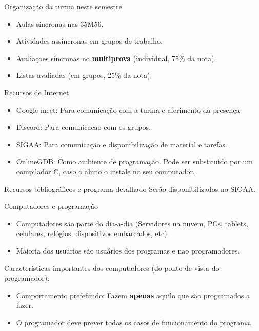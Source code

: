 \documentclass[handout,t]{beamer}
\begin{document}
\begin{frame}{Organização da turma neste semestre}
\vfill
\begin{itemize}
    \item Aulas síncronas nas 35M56. 
    \item Atividades assíncronas em grupos de trabalho.
    \item Avaliaçoes síncronas no \textbf{multiprova} (individual, 75\% da nota).
    \item Listas avaliadas (em grupos, 25\% da nota).
\end{itemize}
\vfill
\end{frame}

\begin{frame}{Recursos de Internet}
\vfill
\begin{itemize}
    \item Google meet: Para comunicação com a turma e aferimento da presença.
    \item Discord: Para comunicacao com os grupos.
    \item SIGAA: Para comunicação e disponibilização de material e tarefas.
    \item OnlineGDB: Como ambiente de programação. Pode ser substituido por um compilador C, caso o aluno o instale no seu computador.
\end{itemize}
\vfill
\end{frame}

\begin{frame}{Recursos bibliográficos e programa detalhado}
\vfill
Serão disponibilizados no SIGAA.
\vfill
\end{frame}

\begin{frame}{Computadores e programação}
\vfill
\begin{itemize}
    \item Computadores são parte do dia-a-dia (Servidores na nuvem, PCs, tablets, celulares, relógios, dispositivos embarcados, etc).
    \item Maioria dos usuários são usuários dos programas e nao programadores.
\end{itemize}
\vfill
Características importantes dos computadores (do ponto de vista do programador):
\begin{itemize}
    \item Comportamento prefefinido: Fazem \textbf{apenas} aquilo que são programados a fazer.
    \item O programador deve prever todos os casos de funcionamento do programa.
\end{itemize}
\end{frame}
\end{document}
